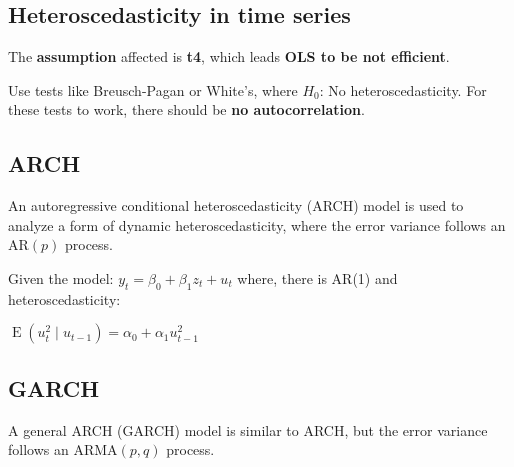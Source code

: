 \documentclass[10pt, a4paper, landscape]{article}
\DeclareMathOperator{\E}{E}
\begin{document}
\begin{multicols}{3}
\section*{Heteroscedasticity in time series}

The \textbf{assumption} affected is \textbf{t4}, which leads \textbf{OLS to be not efficient}.

Use tests like Breusch-Pagan or White's, where \( H_{0} \): No heteroscedasticity. For these tests to work, there should be \textbf{no autocorrelation}.

\subsection*{ARCH}

An autoregressive conditional heteroscedasticity (ARCH) model is used to analyze a form of dynamic heteroscedasticity, where the error variance follows an \( \text{AR}(p) \) process.

Given the model: \( y_{t} = \beta_{0} + \beta_{1} z_{t} + u_{t} \) where, there is AR(1) and heteroscedasticity:

\begin{center}
	\( \E(u_{t}^{2} \mid u_{t - 1}) = \alpha_{0} + \alpha_{1} u_{t - 1}^{2} \)
\end{center}

\subsection*{GARCH}

A general ARCH (GARCH) model is similar to ARCH, but the error variance follows an \( \text{ARMA}(p, q) \) process.

\end{multicols}
\end{document}
